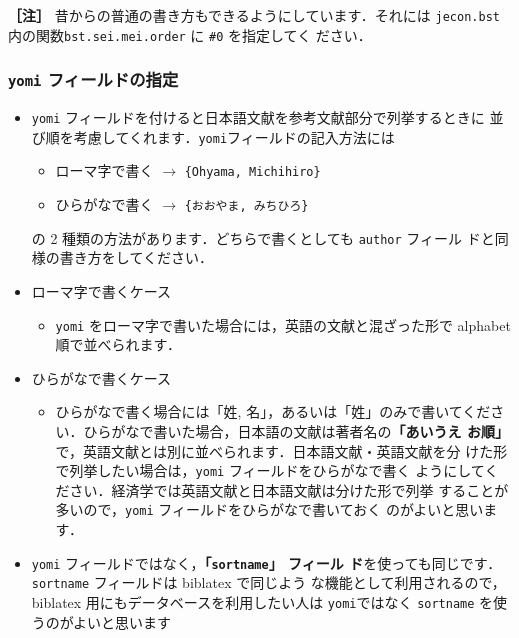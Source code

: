 \documentclass[article]{jlreq}
\newcommand{\midashii}[1]{\noindent \textbf{［#1］}}
\begin{document}
\midashii{注} 昔からの普通の書き方もできるようにしています．それには
\texttt{jecon.bst} 内の関数\texttt{bst.sei.mei.order} に \verb|#0| を指定してく
ださい．


\subsubsection{\texttt{yomi} フィールドの指定}

\begin{itemize}
 \item \texttt{yomi} フィールドを付けると日本語文献を参考文献部分で列挙するときに
      並び順を考慮してくれます．\texttt{yomi}フィールドの記入方法には
       \begin{itemize}
        \item ローマ字で書く $\longrightarrow$ \verb|{Ohyama, Michihiro}|
        \item ひらがなで書く $\longrightarrow$ \verb|{おおやま, みちひろ}|
       \end{itemize}
       の 2 種類の方法があります．どちらで書くとしても \texttt{author} フィール
       ドと同様の書き方をしてください．
 \item ローマ字で書くケース
       \begin{itemize}
        \item \texttt{yomi} をローマ字で書いた場合には，英語の文献と混ざった形で
       alphabet 順で並べられます．
       \end{itemize}
 \item ひらがなで書くケース
       \begin{itemize}
        \item ひらがなで書く場合には「姓, 名」，あるいは「姓」のみで書いてくださ
              い．ひらがなで書いた場合，日本語の文献は著者名の\textbf{「あいうえ
              お順」}で，英語文献とは別に並べられます．日本語文献・英語文献を分
              けた形で列挙したい場合は，\texttt{yomi} フィールドをひらがなで書く
              ようにしてください．経済学では英語文献と日本語文献は分けた形で列挙
              することが多いので，\texttt{yomi} フィールドをひらがなで書いておく
              のがよいと思います．
       \end{itemize}
 \item \texttt{yomi} フィールドではなく，\textbf{「\texttt{sortname}」 フィール
       ド}を使っても同じです．\texttt{sortname} フィールドは biblatex で同じよう
       な機能として利用されるので，biblatex 用にもデータベースを利用したい人は
       \texttt{yomi}ではなく \texttt{sortname} を使うのがよいと思います

\end{itemize}
\end{document}
